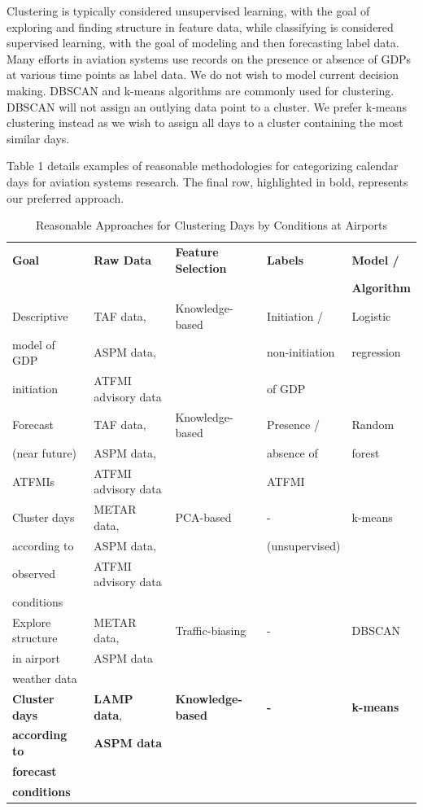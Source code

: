 \documentclass[11pt]{scrartcl}
\begin{document}
Clustering is typically considered unsupervised learning, with the goal of exploring and finding structure in feature data, while classifying is considered supervised learning, with the goal of modeling and then forecasting label data.  Many efforts in aviation systems use records on the presence or absence of GDPs at various time points as label data.  We do not wish to model current decision making.  DBSCAN and k-means algorithms are commonly used for clustering.  DBSCAN will not assign an outlying data point to a cluster.  We prefer k-means clustering instead as we wish to assign all days to a cluster containing the most similar days.

Table 1 details examples of reasonable methodologies for categorizing calendar days for aviation systems research.  The final row, highlighted in bold, represents our preferred approach.

\begin{table}[htdp]
\caption{Reasonable Approaches for Clustering Days by Conditions at Airports}
\begin{center}
\begin{tabular}{|l|l|l|l|l|}
\hline
{\bf Goal}&{\bf Raw Data}&{\bf Feature Selection}&{\bf Labels}&{\bf Model /}\\
&&&&{\bf Algorithm}\\
\hline
Descriptive & TAF data, & Knowledge-based &Initiation / & Logistic\\
model of GDP & ASPM data,&& non-initiation &regression\\
initiation &ATFMI advisory data&& of GDP &\\
\hline
Forecast & TAF data, & Knowledge-based & Presence / & Random\\
(near future) & ASPM data,&& absence of &forest\\
ATFMIs & ATFMI advisory data&& ATFMI &\\
\hline
Cluster days & METAR data, & PCA-based & - & k-means\\
according to & ASPM data, & & (unsupervised) & \\
observed & ATFMI advisory data & & & \\
conditions & & & &\\
\hline
Explore structure& METAR data, & Traffic-biasing & - & DBSCAN\\
in airport & ASPM data & & & \\
weather data & & & & \\
\hline
{\bf Cluster days} & {\bf LAMP data}, & {\bf Knowledge-based} & {\bf -} & {\bf k-means}\\
{\bf according to} & {\bf ASPM data} & & & \\
{\bf forecast} & & & &\\
{\bf conditions} & & & &\\
\hline
\end{tabular}
\end{center}
\label{default}
\end{table}
\end{document}
